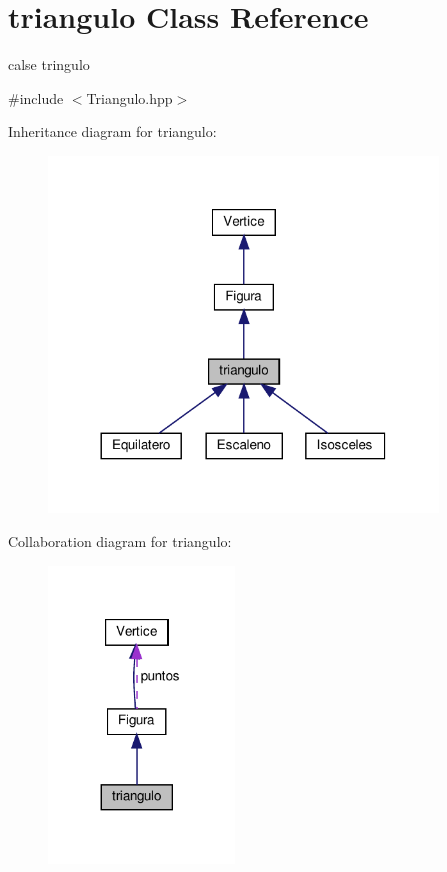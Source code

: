 \hypertarget{classtriangulo}{}\section{triangulo Class Reference}
\label{classtriangulo}


calse tringulo  




{\ttfamily \#include $<$Triangulo.\+hpp$>$}



Inheritance diagram for triangulo\+:
\nopagebreak
\begin{figure}[H]
\begin{center}
\leavevmode
\includegraphics[width=293pt]{classtriangulo__inherit__graph}
\end{center}
\end{figure}


Collaboration diagram for triangulo\+:
\nopagebreak
\begin{figure}[H]
\begin{center}
\leavevmode
\includegraphics[width=140pt]{classtriangulo__coll__graph}
\end{center}
\end{figure}
